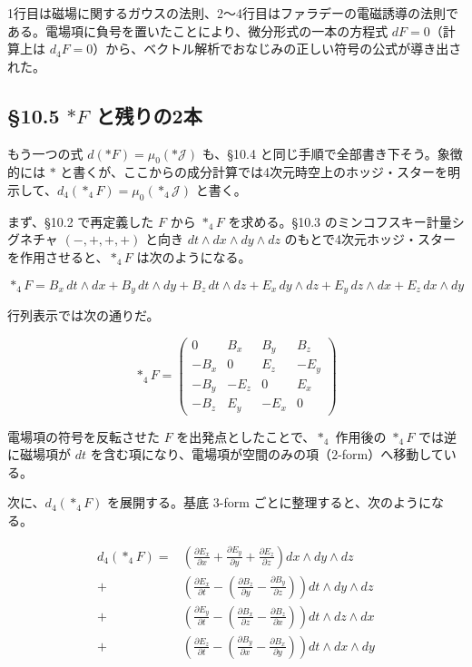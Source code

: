 \documentclass[a4paper,12pt,openany]{book}
\begin{document}
1行目は磁場に関するガウスの法則、2〜4行目はファラデーの電磁誘導の法則である。電場項に負号を置いたことにより、微分形式の一本の方程式
\(dF=0\)（計算上は
\(d_4F=0\)）から、ベクトル解析でおなじみの正しい符号の公式が導き出された。

\par\vspace{0.35em}\par

\hypertarget{ast-f-ux3068ux6b8bux308aux306e2ux672c}{%
\subsection{\texorpdfstring{§10.5 \(\ast F\)
と残りの2本}{§10.5 \textbackslash ast F と残りの2本}}\label{ast-f-ux3068ux6b8bux308aux306e2ux672c}}

もう一つの式 \(d(\ast F) = \mu_0(\ast\mathcal{J})\) も、§10.4
と同じ手順で全部書き下そう。象徴的には \(\ast\)
と書くが、ここからの成分計算では4次元時空上のホッジ・スターを明示して、\(d_4(\ast_4F)=\mu_0(\ast_4\mathcal{J})\)
と書く。

まず、§10.2 で再定義した \(F\) から \(\ast_4F\) を求める。§10.3
のミンコフスキー計量シグネチャ \((-,+,+,+)\) と向き
\(dt\wedge dx\wedge dy\wedge dz\)
のもとで4次元ホッジ・スターを作用させると、\(\ast_4F\)
は次のようになる。

\[
\ast_4F = B_x\,dt\wedge dx + B_y\,dt\wedge dy + B_z\,dt\wedge dz + E_x\,dy\wedge dz + E_y\,dz\wedge dx + E_z\,dx\wedge dy
\]

行列表示では次の通りだ。

\[\ast_4F = \begin{pmatrix}
0 & B_x & B_y & B_z \\
-B_x & 0 & E_z & -E_y \\
-B_y & -E_z & 0 & E_x \\
-B_z & E_y & -E_x & 0
\end{pmatrix}\]

電場項の符号を反転させた \(F\) を出発点としたことで、\(\ast_4\) 作用後の
\(\ast_4F\) では逆に磁場項が \(dt\)
を含む項になり、電場項が空間のみの項（\(2\)-form）へ移動している。

次に、\(d_4(\ast_4F)\) を展開する。基底 \(3\)-form
ごとに整理すると、次のようになる。

\[\begin{aligned}
d_4(\ast_4F) = &\left(\frac{\partial E_x}{\partial x} + \frac{\partial E_y}{\partial y} + \frac{\partial E_z}{\partial z}\right) dx\wedge dy\wedge dz \\
{+} &\left(\frac{\partial E_x}{\partial t} - \left(\frac{\partial B_z}{\partial y} - \frac{\partial B_y}{\partial z}\right)\right) dt\wedge dy\wedge dz \\
{+} &\left(\frac{\partial E_y}{\partial t} - \left(\frac{\partial B_x}{\partial z} - \frac{\partial B_z}{\partial x}\right)\right) dt\wedge dz\wedge dx \\
{+} &\left(\frac{\partial E_z}{\partial t} - \left(\frac{\partial B_y}{\partial x} - \frac{\partial B_x}{\partial y}\right)\right) dt\wedge dx\wedge dy
\end{aligned}\]
\end{document}
